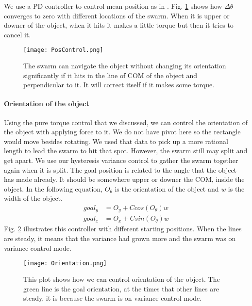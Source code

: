 We use a PD controller to control mean position as in \cite{ShahrokhiIROS2015}. Fig. \ref{fig:PosControlFig} shows how $\Delta \theta$ converges to zero with different locations of the swarm. When it is upper or downer of the object, when it hits it makes a little torque but then it tries to cancel it.
\begin{figure}
\begin{center}
	\texttt{[image: PosControl.png]}
\end{center}
\vspace{-1em}
\caption{\label{fig:PosControlFig}
The swarm can navigate the object without changing its orientation significantly if it hits in the line of COM of the object and perpendicular to it. It will correct itself if it makes some torque.
}
\vspace{-1em}
\end{figure}

\paragraph{Orientation of the object}
Using the pure torque control that we discussed, we can control the orientation of the object with applying force to it. We do not have pivot here so the rectangle would move besides rotating. We used that data to pick up a more rational length to lead the swarm to hit that spot. However, the swarm still may split and get apart. We use our hysteresis variance control to gather the swarm together again when it is split. The goal position is related to the angle that the object has made already. It should be somewhere upper or downer the COM, inside the object. In the following equation, $O_{\theta}$ is the orientation of the object and $w$ is the width of the object.
\begin{align}\nonumber
goal_y &= O_y + Ccos(O_{\theta})w\\
goal_x &= O_x + Csin(O_{\theta})w
\end{align}
Fig. \ref{fig:OrientCont} illustrates this controller with different starting positions. When the lines are steady, it means that the variance had grown more and the swarm was on variance control mode.
\begin{figure}
\begin{center}
	\texttt{[image: Orientation.png]}
\end{center}
\vspace{-1em}
\caption{\label{fig:OrientCont}
This plot shows how we can control orientation of the object. The green line is the goal orientation, at the times that other lines are steady, it is because the swarm is on variance control mode.
}
\vspace{-1em}
\end{figure}


